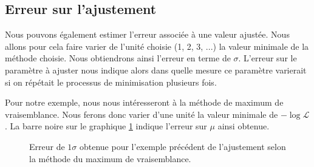 \subsection{Erreur sur l'ajustement}
Nous pouvons également estimer l'erreur associée à une valeur ajustée. Nous allons pour cela faire varier de l'unité choisie (1, 2, 3, ...) la valeur minimale de la méthode choisie. Nous obtiendrons ainsi l'erreur en terme de $\sigma$. L'erreur sur le paramètre à ajuster nous indique alors dans quelle mesure ce paramètre varierait si on répétait le processus de minimisation plusieurs fois.

Pour notre exemple, nous nous intéresseront à la méthode de maximum de vraisemblance. Nous ferons donc varier d'une unité la valeur minimale de  $-\log{\mathcal{L}}$. La barre noire sur le graphique \ref{fig:error} indique l'erreur sur $\mu$ ainsi obtenue.


\begin{figure}[h!]
\caption{Erreur de $1\sigma$ obtenue pour l'exemple précédent de l'ajustement selon la méthode du maximum de vraisemblance.}
\label{fig:error}
\end{figure}




